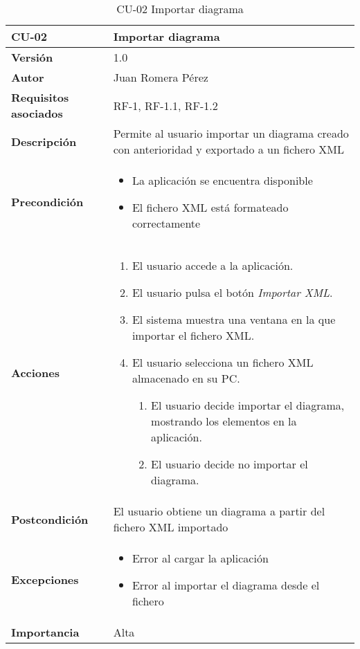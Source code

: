\begin{table}[p]
    \centering
    \begin{tabularx}{\linewidth}{ p{} p{}}
		\toprule
		\textbf{CU-02}    & \textbf{Importar diagrama}\\
		\toprule
		\textbf{Versión}              & 1.0    \\
		\textbf{Autor}                & Juan Romera Pérez \\
		\textbf{Requisitos asociados} & RF-1, RF-1.1, RF-1.2 \\
		\textbf{Descripción}          & Permite al usuario importar un diagrama creado con anterioridad y exportado a un fichero XML \\
		\textbf{Precondición}         & \begin{itemize}
		    \item La aplicación se encuentra disponible
            \item El fichero XML está formateado correctamente
		\end{itemize} \\
		\textbf{Acciones}             &
		\begin{enumerate}
			\def\labelenumi{\arabic{enumi}.}
			\tightlist
			\item El usuario accede a la aplicación.
			\item El usuario pulsa el botón \emph{Importar XML}.
            \item El sistema muestra una ventana en la que importar el fichero XML.
            \item El usuario selecciona un fichero XML almacenado en su PC.
            \begin{enumerate}
                \item El usuario decide importar el diagrama, mostrando los elementos en la aplicación.
                \item El usuario decide no importar el diagrama.
            \end{enumerate}
		\end{enumerate}\\
		\textbf{Postcondición}        & El usuario obtiene un diagrama a partir del fichero XML importado \\
		\textbf{Excepciones}          & \begin{itemize}
		    \item Error al cargar la aplicación
            \item Error al importar el diagrama desde el fichero
		\end{itemize} \\
		\textbf{Importancia}          & Alta \\
		\bottomrule
    \end{tabularx}
    \caption{CU-02 Importar diagrama}
\end{table}


